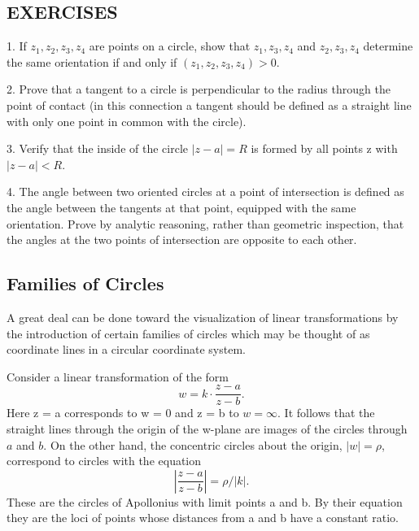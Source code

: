 \subsection*{EXERCISES}
1. If $z_{1}, z_{2}, z_{3}, z_{4}$ are points on a circle, show that $z_{1}, z_{3}, z_{4}$ and $z_{2}, z_{3}, z_{4}$ determine the same orientation if and only if $(z_{1}, z_{2}, z_{3}, z_{4}) > 0$.

2. Prove that a tangent to a circle is perpendicular to the radius through the point of contact (in this connection a tangent should be defined as a straight line with only one point in common with the circle).

3. Verify that the inside of the circle $|z - a| = R$ is formed by all points z with $|z - a| < R$.

4. The angle between two oriented circles at a point of intersection is defined as the angle between the tangents at that point, equipped with the same orientation. Prove by analytic reasoning, rather than geometric inspection, that the angles at the two points of intersection are opposite to each other.

\setcounter{section}{3}\setcounter{subsection}{4}\subsection{Families of Circles}\label{sec:3.3.5}
A great deal can be done toward the visualization of linear transformations by the introduction of certain families of circles which may be thought of as coordinate lines in a circular coordinate system.

Consider a linear transformation of the form
\begin{equation*}
w = k \cdot \frac {z - a}{z - b}.
\end{equation*}
Here z = a corresponds to w = 0 and z = b to $w = \infty$. It follows that the straight lines through the origin of the w-plane are images of the
circles through $a$ and $b$. On the other hand, the concentric circles about the origin, $|w| = \rho$, correspond to circles with the equation
\begin{equation*}
\left| \frac {z - a}{z - b} \right| = \rho / | k |.
\end{equation*}
These are the circles of Apollonius with limit points a and b. By their equation they are the loci of points whose distances from a and b have a constant ratio.

